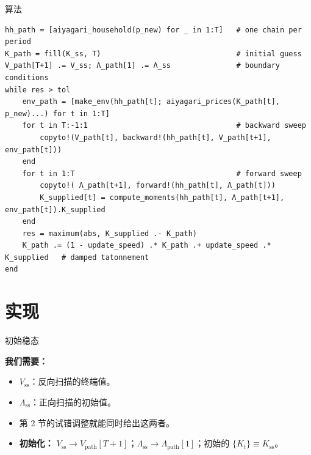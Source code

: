 \documentclass[10pt,aspectratio=169]{beamer}
\begin{document}
\begin{frame}[fragile]{算法}
\begin{lstlisting}[basicstyle=\ttfamily\scriptsize]
hh_path = [aiyagari_household(p_new) for _ in 1:T]   # one chain per period
K_path = fill(K_ss, T)                               # initial guess
V_path[T+1] .= V_ss; Λ_path[1] .= Λ_ss               # boundary conditions
while res > tol
    env_path = [make_env(hh_path[t]; aiyagari_prices(K_path[t], p_new)...) for t in 1:T]
    for t in T:-1:1                                  # backward sweep
        copyto!(V_path[t], backward!(hh_path[t], V_path[t+1], env_path[t]))
    end
    for t in 1:T                                     # forward sweep
        copyto!( Λ_path[t+1], forward!(hh_path[t], Λ_path[t]))
        K_supplied[t] = compute_moments(hh_path[t], Λ_path[t+1], env_path[t]).K_supplied
    end
    res = maximum(abs, K_supplied .- K_path)
    K_path .= (1 - update_speed) .* K_path .+ update_speed .* K_supplied   # damped tatonnement
end
\end{lstlisting}
\end{frame}

\section[实现]{实现}

\begin{frame}{初始稳态}

\textbf{我们需要：}

\begin{itemize}
  \item $V_{\mathrm{ss}}$：反向扫描的终端值。
  \item $\Lambda_{\mathrm{ss}}$：正向扫描的初始值。
\end{itemize}

\vspace{0.4em}

\begin{itemize}
  \item 第 2 节的试错调整就能同时给出这两者。
  \item \textbf{初始化：} $V_{\mathrm{ss}} \to V_\mathrm{path}[T+1]$；$\Lambda_{\mathrm{ss}} \to \Lambda_\mathrm{path}[1]$；初始的 $\{K_t\} \equiv K_{\mathrm{ss}}$。
\end{itemize}

\end{frame}
\end{document}
